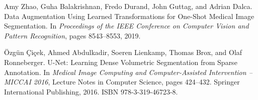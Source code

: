 \documentclass{midl}
\begin{document}
\begin{thebibliography}{50}
Amy Zhao, Guha Balakrishnan, Fredo Durand, John Guttag, and Adrian Dalca.
\newblock Data {Augmentation} {Using} {Learned} {Transformations} for
  {One}-{Shot} {Medical} {Image} {Segmentation}.
\newblock In \emph{Proceedings of the {IEEE} {Conference} on {Computer}
  {Vision} and {Pattern} {Recognition}}, pages 8543--8553, 2019.

Özgün Çiçek, Ahmed Abdulkadir, Soeren Lienkamp, Thomas Brox, and Olaf
  Ronneberger.
 {U}-{Net}: {Learning} {Dense} {Volumetric} {Segmentation} from
  {Sparse} {Annotation}.
\newblock In \emph{Medical {Image} {Computing} and {Computer}-{Assisted}
  {Intervention} – {MICCAI} 2016}, Lecture {Notes} in {Computer} {Science},
  pages 424--432. Springer International Publishing, 2016.
\newblock ISBN 978-3-319-46723-8.

\end{thebibliography}
 
\end{document}
